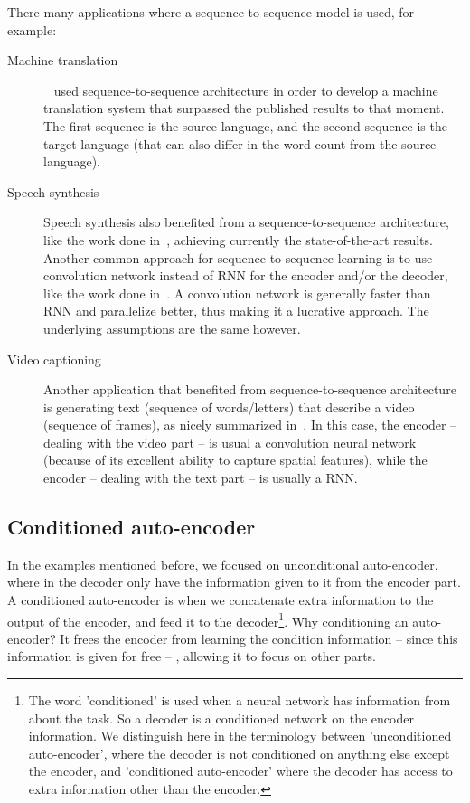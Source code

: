     \par There many applications where a sequence-to-sequence model is used, for example:
    \begin{description}
      \item [Machine translation]~\citep{sutskever2014sequence} used sequence-to-sequence architecture in order to develop a machine translation system that surpassed the published results to that moment. The first sequence is the source language, and the second sequence is the target language (that can also differ in the word count from the source language).
      \item [Speech synthesis] Speech synthesis also benefited from a sequence-to-sequence architecture, like the work done in~\citep{oord2016wavenet,wang2017tacotron}, achieving currently the state-of-the-art results. Another common approach for sequence-to-sequence learning is to use convolution network instead of RNN for the encoder and/or the decoder, like the work done in~\citep{ping2017deep}. A convolution network is generally faster than RNN and parallelize better, thus making it a lucrative approach. The underlying assumptions are the same however.
      \item [Video captioning] Another application that benefited from sequence-to-sequence architecture is generating text (sequence of words/letters) that describe a video (sequence of frames), as nicely summarized in~\citep{aafaq2018video}. In this case, the encoder -- dealing with the video part -- is usual a convolution neural network (because of its excellent ability to capture spatial features), while the encoder -- dealing with the text part -- is usually a RNN.
    \end{description}

  \subsection{Conditioned auto-encoder}
    \par In the examples mentioned before, we focused on unconditional auto-encoder, where in the decoder only have the information given to it from the encoder part. A conditioned auto-encoder is when we concatenate extra information to the output of the encoder, and feed it to the decoder\footnote{The word 'conditioned' is used when a neural network has information from about the task. So a decoder is a conditioned network on the encoder information. We distinguish here in the terminology between 'unconditioned auto-encoder', where the decoder is not conditioned on anything else except the encoder, and 'conditioned auto-encoder' where the decoder has access to extra information other than the encoder.}. Why conditioning an auto-encoder? It frees the encoder from learning the condition information -- since this information is given for free -- , allowing it to focus on other parts.

